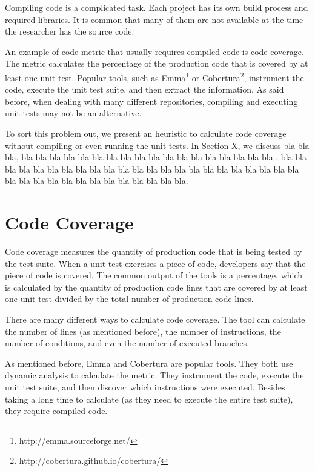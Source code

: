 \documentclass{sig-alternate}
\begin{document}
Compiling code is a complicated task. Each project has its own build process and
required libraries. It is common that many of them are not available at the time the
researcher has the source code.

An example of code metric that usually requires compiled code is code coverage. 
The metric calculates the percentage of the production code that is covered by at least
one unit test. Popular tools, such as Emma\footnote{http://emma.sourceforge.net/} or
Cobertura\footnote{http://cobertura.github.io/cobertura/}, instrument the code, execute
the unit test suite, and then extract the information. As said before, when dealing
with many different repositories, compiling and executing unit tests may not be
an alternative.

To sort this problem out, we present an heuristic to calculate code coverage without
compiling or even running the unit tests. In Section X, we discuss bla bla bla,
bla bla bla bla bla bla bla bla bla bla bla bla bla bla bla bla bla bla ,
bla bla bla bla bla bla bla bla bla bla bla bla bla bla bla bla bla bla 
bla bla bla bla bla bla bla bla bla bla bla bla bla bla bla bla bla bla\cite{bowman:reasoning}.




\section{Code Coverage}

Code coverage measures the quantity of production code that is being tested by
the test suite. When a unit test exercises a piece of code, developers say that the piece
of code is covered. The common output of the tools is a percentage, which is calculated
by the quantity of production code lines that are covered by at least one unit test divided by
the total number of production code lines.

There are many different ways to calculate code coverage. The tool can calculate the number
of lines (as mentioned before), the number of instructions, the number of conditions, and even
the number of executed branches.

As mentioned before, Emma and Cobertura are popular tools. 
They both use dynamic analysis to calculate the metric. They instrument the code, 
execute the unit test suite, and then discover which instructions were executed.
Besides taking a long time to calculate (as they need to execute the entire test suite),
they require compiled code.
\end{document}
